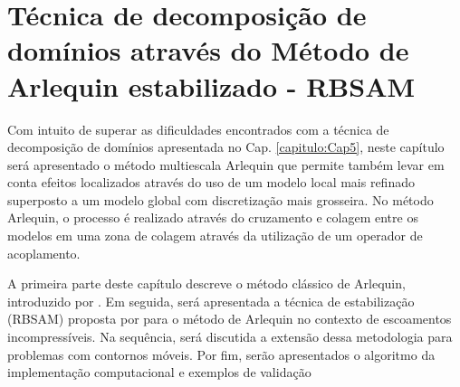 \documentclass[tese_patricia]{subfiles}
\begin{document}

\chapter[Método de Arlequin estabilizado]{Técnica de decomposição de domínios através do Método de Arlequin estabilizado - RBSAM} \label{capitulo:Cap6}

Com intuito de superar as dificuldades encontrados com a técnica de decomposição de domínios apresentada no Cap. \ref{capitulo:Cap5}, neste capítulo será apresentado o método multiescala Arlequin que permite também levar em conta efeitos localizados através do uso de um modelo local mais refinado superposto a um modelo global com discretização mais grosseira. No método Arlequin, o processo é realizado através do cruzamento e colagem entre os modelos em uma zona de colagem através da utilização de um operador de acoplamento.

A primeira parte deste capítulo descreve o método clássico de Arlequin, introduzido por . Em seguida, será apresentada a técnica de estabilização (RBSAM) proposta por  para o método de Arlequin no contexto de escoamentos incompressíveis. Na sequência, será discutida a extensão dessa metodologia para problemas com contornos móveis. Por fim, serão apresentados o algoritmo da implementação computacional e exemplos de validação
\end{document}
